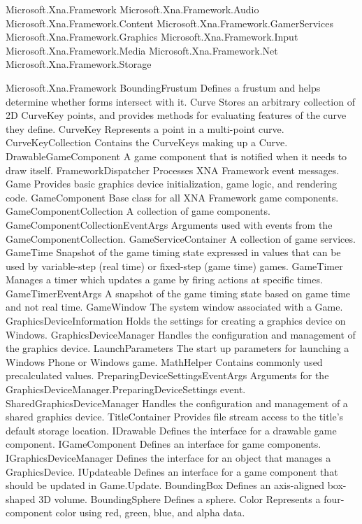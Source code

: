 Microsoft.Xna.Framework
Microsoft.Xna.Framework.Audio
Microsoft.Xna.Framework.Content
Microsoft.Xna.Framework.GamerServices
Microsoft.Xna.Framework.Graphics
Microsoft.Xna.Framework.Input
Microsoft.Xna.Framework.Media
Microsoft.Xna.Framework.Net
Microsoft.Xna.Framework.Storage


Microsoft.Xna.Framework
	BoundingFrustum	Defines a frustum and helps determine whether forms intersect with it.
	Curve	Stores an arbitrary collection of 2D CurveKey points, and provides methods for evaluating features of the curve they define.
	CurveKey	Represents a point in a multi-point curve.
	CurveKeyCollection	Contains the CurveKeys making up a Curve.
	DrawableGameComponent	A game component that is notified when it needs to draw itself.
	FrameworkDispatcher	Processes XNA Framework event messages.
	Game	Provides basic graphics device initialization, game logic, and rendering code.
	GameComponent	Base class for all XNA Framework game components.
	GameComponentCollection	A collection of game components.
	GameComponentCollectionEventArgs	Arguments used with events from the GameComponentCollection.
	GameServiceContainer	A collection of game services.
	GameTime	 Snapshot of the game timing state expressed in values that can be used by variable-step (real time) or fixed-step (game time) games.
	GameTimer	Manages a timer which updates a game by firing actions at specific times.
	GameTimerEventArgs	A snapshot of the game timing state based on game time and not real time.
	GameWindow	The system window associated with a Game.
	GraphicsDeviceInformation	Holds the settings for creating a graphics device on Windows.
	GraphicsDeviceManager	 Handles the configuration and management of the graphics device.
	LaunchParameters	The start up parameters for launching a Windows Phone or Windows game.
	MathHelper	Contains commonly used precalculated values.
	PreparingDeviceSettingsEventArgs	Arguments for the GraphicsDeviceManager.PreparingDeviceSettings event.
	SharedGraphicsDeviceManager	 Handles the configuration and management of a shared graphics device.
	TitleContainer	Provides file stream access to the title's default storage location.
	IDrawable	Defines the interface for a drawable game component.
	IGameComponent	Defines an interface for game components.
	IGraphicsDeviceManager	Defines the interface for an object that manages a GraphicsDevice.
	IUpdateable	Defines an interface for a game component that should be updated in Game.Update.
	BoundingBox	Defines an axis-aligned box-shaped 3D volume.
	BoundingSphere	Defines a sphere.
	Color	Represents a four-component color using red, green, blue, and alpha data.
